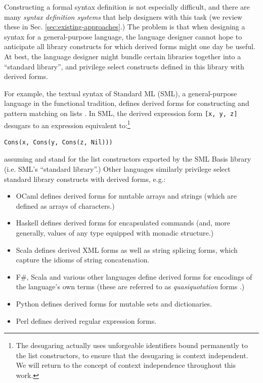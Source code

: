 
Constructing a formal syntax definition is not especially difficult, and there are many \emph{syntax definition systems} that help designers with this task (we review these in Sec. \ref{sec:existing-approaches}.) The problem is that when designing a syntax for a general-purpose language, the language designer cannot hope to anticipate all library constructs for which derived forms might one day be useful. At best, the language designer might bundle certain libraries together into a ``standard library'', and privilege select constructs defined in this library with derived forms. 

For example, the textual syntax of Standard ML (SML), a general-purpose language in the functional tradition, defines derived forms for constructing and pattern matching on lists \cite{mthm97-for-dart,harper1997programming}. In SML, the derived expression form \lstinline{[x, y, z]} desugars to an expression equivalent to:\footnote{The desugaring actually uses unforgeable identifiers bound permanently to the list constructors, to ensure that the desugaring is context independent. We will return to the concept of context independence throughout this work.}
\begin{lstlisting}[numbers=none]
Cons(x, Cons(y, Cons(z, Nil)))
\end{lstlisting}
assuming  and  stand for the list constructors exported by the SML Basis library (i.e. SML's ``standard library''.) Other languages similarly privilege select standard library constructs with derived forms, e.g.:

\begin{itemize}
\item OCaml defines derived forms for mutable arrays and strings (which are defined as arrays of characters.)
\item Haskell defines derived forms for encapsulated commands (and, more generally, values of any type equipped with monadic structure.)
\item Scala defines derived XML forms as well as string splicing forms, which capture the idioms of string concatenation.
\item F\#, Scala and various other languages define derived forms for encodings of the language's own terms (these are referred to as \emph{quasiquotation} forms \cite{shabalin2013quasiquotes}.)
\item Python defines derived forms for mutable sets and dictionaries.
\item Perl defines derived regular expression forms.
\end{itemize}

